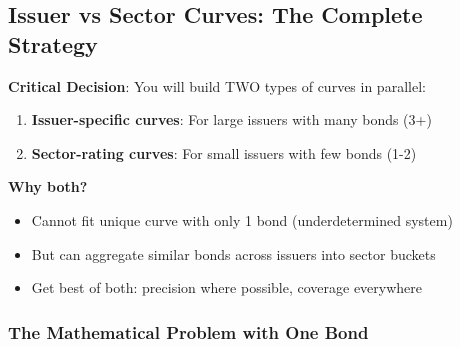 \documentclass[11pt,a4paper]{article}
\begin{document}
\subsection{Issuer vs Sector Curves: The Complete Strategy}

\begin{keybox}
\textbf{Critical Decision}: You will build TWO types of curves in parallel:

\begin{enumerate}
    \item \textbf{Issuer-specific curves}: For large issuers with many bonds (3+)
    \item \textbf{Sector-rating curves}: For small issuers with few bonds (1-2)
\end{enumerate}

\textbf{Why both?}
\begin{itemize}
    \item Cannot fit unique curve with only 1 bond (underdetermined system)
    \item But can aggregate similar bonds across issuers into sector buckets
    \item Get best of both: precision where possible, coverage everywhere
\end{itemize}
\end{keybox}

\subsubsection{The Mathematical Problem with One Bond}
\end{document}
